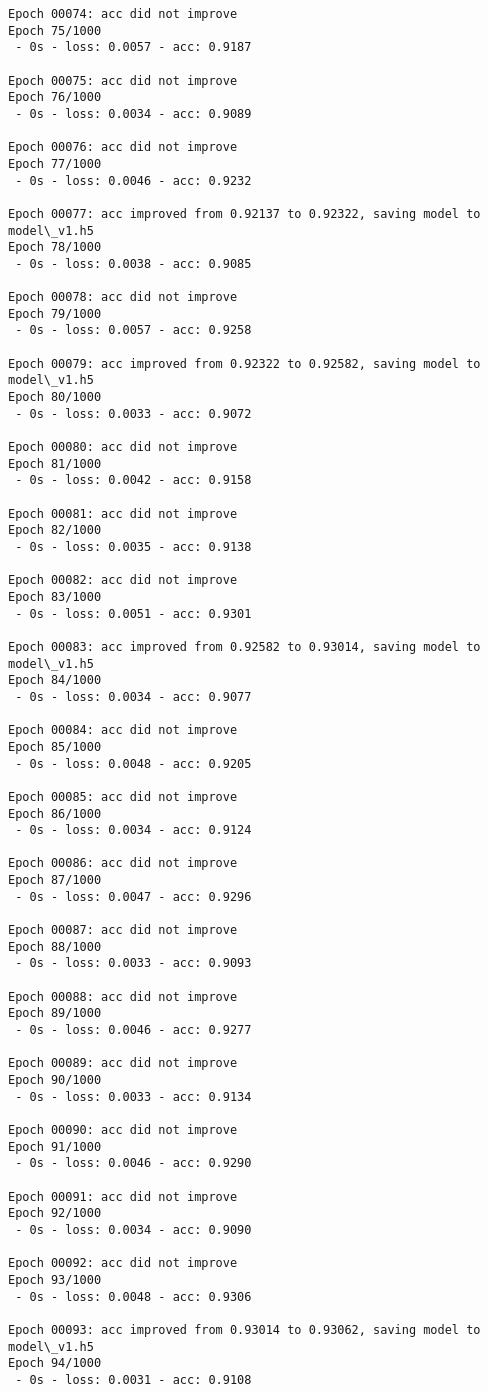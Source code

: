 \documentclass[11pt]{article}
\begin{document}
\begin{Verbatim}[commandchars=\\\{\}]
Epoch 00074: acc did not improve
Epoch 75/1000
 - 0s - loss: 0.0057 - acc: 0.9187

Epoch 00075: acc did not improve
Epoch 76/1000
 - 0s - loss: 0.0034 - acc: 0.9089

Epoch 00076: acc did not improve
Epoch 77/1000
 - 0s - loss: 0.0046 - acc: 0.9232

Epoch 00077: acc improved from 0.92137 to 0.92322, saving model to model\_v1.h5
Epoch 78/1000
 - 0s - loss: 0.0038 - acc: 0.9085

Epoch 00078: acc did not improve
Epoch 79/1000
 - 0s - loss: 0.0057 - acc: 0.9258

Epoch 00079: acc improved from 0.92322 to 0.92582, saving model to model\_v1.h5
Epoch 80/1000
 - 0s - loss: 0.0033 - acc: 0.9072

Epoch 00080: acc did not improve
Epoch 81/1000
 - 0s - loss: 0.0042 - acc: 0.9158

Epoch 00081: acc did not improve
Epoch 82/1000
 - 0s - loss: 0.0035 - acc: 0.9138

Epoch 00082: acc did not improve
Epoch 83/1000
 - 0s - loss: 0.0051 - acc: 0.9301

Epoch 00083: acc improved from 0.92582 to 0.93014, saving model to model\_v1.h5
Epoch 84/1000
 - 0s - loss: 0.0034 - acc: 0.9077

Epoch 00084: acc did not improve
Epoch 85/1000
 - 0s - loss: 0.0048 - acc: 0.9205

Epoch 00085: acc did not improve
Epoch 86/1000
 - 0s - loss: 0.0034 - acc: 0.9124

Epoch 00086: acc did not improve
Epoch 87/1000
 - 0s - loss: 0.0047 - acc: 0.9296

Epoch 00087: acc did not improve
Epoch 88/1000
 - 0s - loss: 0.0033 - acc: 0.9093

Epoch 00088: acc did not improve
Epoch 89/1000
 - 0s - loss: 0.0046 - acc: 0.9277

Epoch 00089: acc did not improve
Epoch 90/1000
 - 0s - loss: 0.0033 - acc: 0.9134

Epoch 00090: acc did not improve
Epoch 91/1000
 - 0s - loss: 0.0046 - acc: 0.9290

Epoch 00091: acc did not improve
Epoch 92/1000
 - 0s - loss: 0.0034 - acc: 0.9090

Epoch 00092: acc did not improve
Epoch 93/1000
 - 0s - loss: 0.0048 - acc: 0.9306

Epoch 00093: acc improved from 0.93014 to 0.93062, saving model to model\_v1.h5
Epoch 94/1000
 - 0s - loss: 0.0031 - acc: 0.9108


\end{Verbatim}
\end{document}
